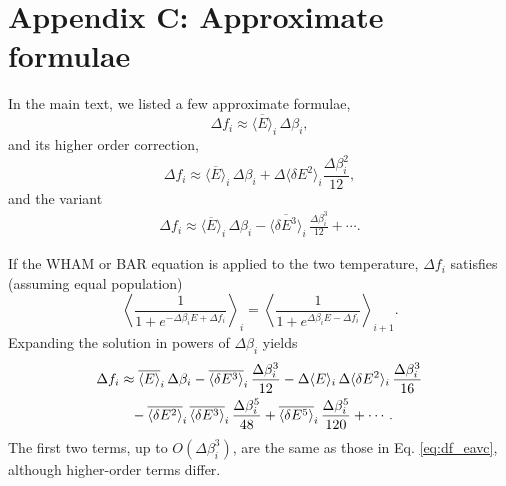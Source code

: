 \documentclass[aip,jcp,preprint,notitlepage, superscriptaddress]{revtex4-1}
\begin{document}
\section{Appendix C: Approximate formulae}




In the main text,
we listed a few approximate formulae,
%
\begin{equation}
\Delta f_i
\approx
\overline{ \langle E \rangle }_i \, \Delta \beta_i,
\tag{C1}
\label{eq:df_eav}
\end{equation}
%
and its higher order correction,
%
\begin{equation}
\Delta f_i
\approx
\overline{ \langle E \rangle }_i \, \Delta \beta_i
+
\Delta \langle \delta E^2 \rangle_i
\frac{ \Delta \beta_i^2 }{ 12 },
\tag{C2}
\label{eq:df_eavb}
\end{equation}
%
and the variant
%
\begin{align}
\Delta f_i
\approx
\overline{ \langle E \rangle }_i \, \Delta \beta_i
-
\overline{ \langle \delta E^3 \rangle }_i
\, \frac{ \Delta \beta_i^3 } { 12 }
+ \cdots.
\tag{C3}
\label{eq:df_eavc}
\end{align}



If the WHAM or BAR equation
is applied to the two temperature,
$\Delta f_i$ satisfies
(assuming equal population)
%
\begin{equation*}
\left\langle
\frac{ 1 }
{ 1 + e^{-\Delta \beta_i E + \Delta f_i} }
\right\rangle_i
=
\left\langle
\frac{ 1 }
{ 1 + e^{\Delta \beta_i E - \Delta f_i} }
\right\rangle_{i+1}.
\end{equation*}
%
Expanding the solution
in powers of $\Delta \beta_i$
yields
\begin{align}
\Delta f_i
&
\approx
\overline{ \langle E \rangle }_i \, \Delta \beta_i
%
-\overline{ \langle \delta E^3 \rangle }_i
\, \frac{ \Delta \beta_i^3 } { 12 }
%
-\Delta \langle E \rangle_i
\, \Delta \langle \delta E^2 \rangle_i
\, \frac{ \Delta \beta_i^3 } { 16 }
\notag \\
&
\phantom{\approx}
%
-\overline{ \langle \delta E^2 \rangle }_i
\, \overline{ \langle \delta E^3 \rangle }_i
\, \frac{ \Delta \beta_i^5 } { 48 }
%
+\overline{ \langle \delta E^5 \rangle }_i
\, \frac{ \Delta \beta_i^5 } { 120 }
+ \cdots.
\notag
\end{align}
%
The first two terms, up to $O(\Delta \beta_i^3)$,
are the same as those in Eq. \eqref{eq:df_eavc},
although higher-order terms differ.
%
\end{document}
